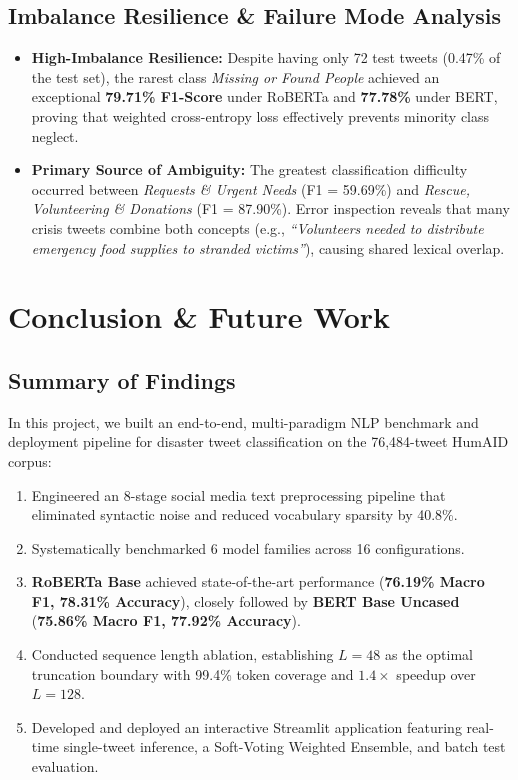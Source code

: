 \documentclass[12pt,a4paper]{article}
\begin{document}
\subsection{Imbalance Resilience \& Failure Mode Analysis}
\begin{itemize}
    \item \textbf{High-Imbalance Resilience:} Despite having only 72 test tweets (0.47\% of the test set), the rarest class \textit{Missing or Found People} achieved an exceptional \textbf{79.71\% F1-Score} under RoBERTa and \textbf{77.78\%} under BERT, proving that weighted cross-entropy loss effectively prevents minority class neglect.
    \item \textbf{Primary Source of Ambiguity:} The greatest classification difficulty occurred between \textit{Requests \& Urgent Needs} (F1 = 59.69\%) and \textit{Rescue, Volunteering \& Donations} (F1 = 87.90\%). Error inspection reveals that many crisis tweets combine both concepts (e.g., \textit{``Volunteers needed to distribute emergency food supplies to stranded victims''}), causing shared lexical overlap.
\end{itemize}

\section{Conclusion \& Future Work}

\subsection{Summary of Findings}
In this project, we built an end-to-end, multi-paradigm NLP benchmark and deployment pipeline for disaster tweet classification on the 76,484-tweet HumAID corpus:
\begin{enumerate}
    \item Engineered an 8-stage social media text preprocessing pipeline that eliminated syntactic noise and reduced vocabulary sparsity by 40.8\%.
    \item Systematically benchmarked 6 model families across 16 configurations.
    \item \textbf{RoBERTa Base} achieved state-of-the-art performance (\textbf{76.19\% Macro F1, 78.31\% Accuracy}), closely followed by \textbf{BERT Base Uncased} (\textbf{75.86\% Macro F1, 77.92\% Accuracy}).
    \item Conducted sequence length ablation, establishing $L = 48$ as the optimal truncation boundary with 99.4\% token coverage and $1.4\times$ speedup over $L=128$.
    \item Developed and deployed an interactive Streamlit application featuring real-time single-tweet inference, a Soft-Voting Weighted Ensemble, and batch test evaluation.
\end{enumerate}
\end{document}
